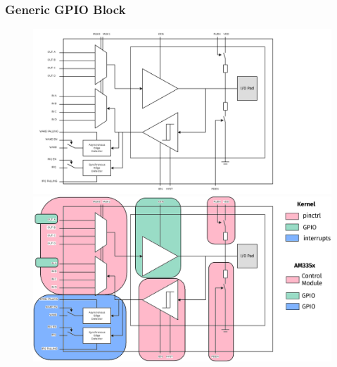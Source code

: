 \begin{frame}
  \frametitle{Generic GPIO Block}
  \begin{overlayarea}{\textwidth}{\textheight}
    \begin{figure}
      \centering
      {%
      \includegraphics[scale=0.28]{images/gpio-block.png}%
      }%
      {%
      \includegraphics[scale=0.28]{images/gpio-block-color.png}%
      }%
    \end{figure}
  \end{overlayarea}
  \vspace*{-10mm}
\end{frame}

